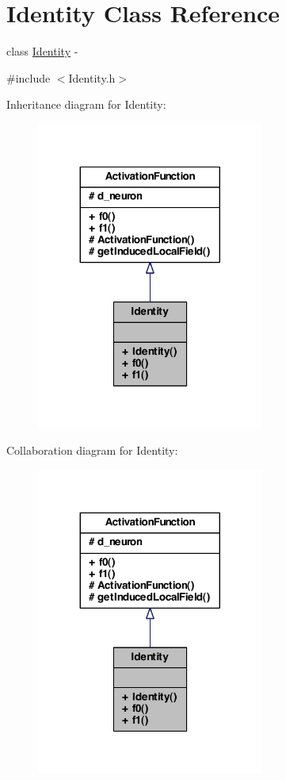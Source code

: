\hypertarget{class_identity}{
\section{Identity Class Reference}
\label{class_identity}
}


class \hyperlink{class_identity}{Identity} -\/  




{\ttfamily \#include $<$Identity.h$>$}



Inheritance diagram for Identity:
\nopagebreak
\begin{figure}[H]
\begin{center}
\leavevmode
\includegraphics[width=212pt]{class_identity__inherit__graph}
\end{center}
\end{figure}


Collaboration diagram for Identity:
\nopagebreak
\begin{figure}[H]
\begin{center}
\leavevmode
\includegraphics[width=212pt]{class_identity__coll__graph}
\end{center}
\end{figure}
